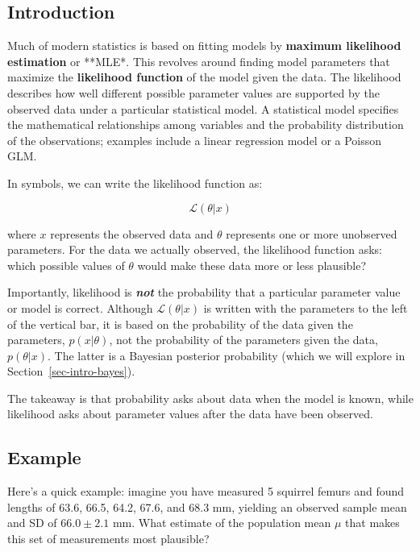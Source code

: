 \documentclass[
  13,
  letterpaper,
]{report}
\begin{document}
\subsection{Introduction}\label{sec-intro-mle-intro}

Much of modern statistics is based on fitting models by \textbf{maximum
likelihood estimation} or **MLE*. This revolves around finding model
parameters that maximize the \textbf{likelihood function} of the model
given the data. The likelihood describes how well different possible
parameter values are supported by the observed data under a particular
statistical model. A statistical model specifies the mathematical
relationships among variables and the probability distribution of the
observations; examples include a linear regression model or a Poisson
GLM.

In symbols, we can write the likelihood function as:

\[\mathcal{L}\left(\theta|x\right)\]

where \(x\) represents the observed data and \(\theta\) represents one
or more unobserved parameters. For the data we actually observed, the
likelihood function asks: which possible values of \(\theta\) would make
these data more or less plausible?

Importantly, likelihood is \textbf{\emph{not}} the probability that a
particular parameter value or model is correct. Although
\(\mathcal{L}\left(\theta|x\right)\) is written with the parameters to
the left of the vertical bar, it is based on the probability of the data
given the parameters, \(p\left(x|\theta\right)\), not the probability of
the parameters given the data, \(p\left(\theta|x\right)\). The latter is
a Bayesian posterior probability (which we will explore in
Section~\ref{sec-intro-bayes}).

The takeaway is that probability asks about data when the model is
known, while likelihood asks about parameter values after the data have
been observed.

\subsection{Example}\label{sec-intro-mle-example}

Here's a quick example: imagine you have measured 5 squirrel femurs and
found lengths of 63.6, 66.5, 64.2, 67.6, and 68.3 mm, yielding an
observed sample mean and SD of \(66.0\pm2.1\) mm. What estimate of the
population mean \(\mu\) that makes this set of measurements most
plausible?
\end{document}

